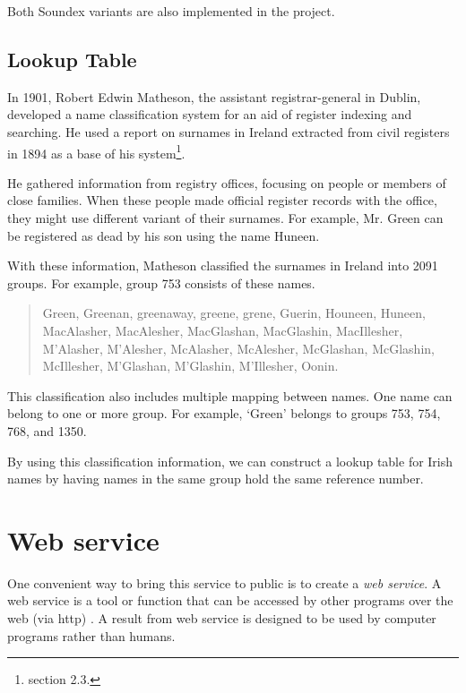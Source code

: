 Both Soundex variants are also implemented in the project.

\subsection{Lookup Table}
\label{sub:lookuptable}

In 1901, Robert Edwin Matheson, the assistant registrar-general in Dublin,
developed a name classification system \cite{MathesonV} for an aid of register indexing
and searching. He used a report on surnames in Ireland extracted from
civil registers \cite{MathesonSR} in 1894 as a base
of his system\footnote{\cite{adamw} section 2.3.}.

He gathered information from registry offices, focusing on
people or members of close families. When these people made official
register records with the office, they might use different variant
of their surnames. For example, Mr. Green can be registered as dead
by his son using the name Huneen.

With these information, Matheson classified the surnames in Ireland
into 2091 groups. For example, group 753 consists of these names.

\begin{quotation} \noindent
Green, Greenan, greenaway, greene, grene, Guerin, Houneen, Huneen,
MacAlasher, MacAlesher, MacGlashan, MacGlashin, MacIllesher, M'Alasher,
M'Alesher, McAlasher, McAlesher, McGlashan, McGlashin, McIllesher,
M'Glashan, M'Glashin, M'Illesher, Oonin.
\end{quotation}

This classification also includes multiple mapping between names.
One name can belong to one or more group. For example, `Green'
belongs to groups 753, 754, 768, and 1350.

By using this classification information, we can construct a lookup table
for Irish names by having names in the same group hold the same
reference number.

\section{Web service}

One convenient way to bring this service to public is to create a \emph{web service}.
A web service is a tool or function that can be accessed by other programs
over the web (via http) \cite{ws1}. A result from web service is designed
to be used by computer programs rather than humans.

